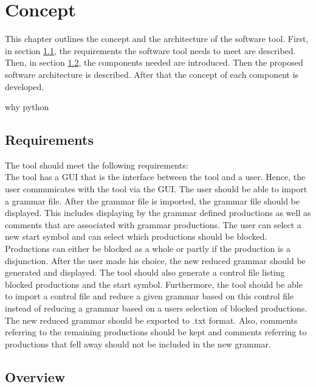 
\chapter{Concept}\label{cha:Concept}
This chapter outlines the concept and the architecture of the software tool.
First, in section \ref{sec:ConceptRequirements}, the requirements the software tool needs to meet are described.
Then, in section \ref{sec:ConceptOverview}, the components needed are introduced.
 Then the proposed software architecture is described. After that the concept of each component is developed.

why python

\section{Requirements}\label{sec:ConceptRequirements}
The tool should meet the following requirements:\\
The tool has a GUI that is the interface between the tool and a user. Hence, the user communicates with the tool via the GUI. The user should be able to import a grammar file. After the grammar file is imported, the grammar file should be displayed. 
This includes displaying by the grammar defined productions as well as comments that are associated with grammar productions.
The user can select a new start symbol and can select which productions should be blocked. 
Productions can either be blocked as a whole or partly if the production is a disjunction.
After the user made his choice, the new reduced grammar should be generated and displayed.
The tool should also generate a control file listing blocked productions and the start symbol.
Furthermore, the tool should be able to import a control file and reduce a given grammar based on this control file instead of reducing a grammar based on a users selection of blocked productions.
The new reduced grammar should be exported to .txt format.
Also, comments referring to the remaining productions should be kept and comments referring to productions that fell away should not be included in the new grammar.

\section{Overview}\label{sec:ConceptOverview}

